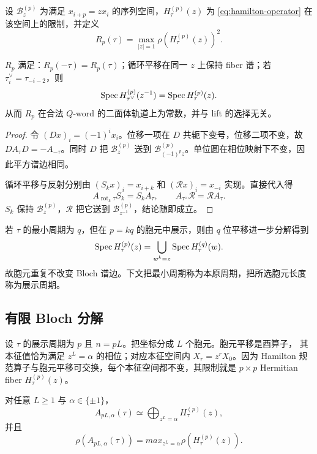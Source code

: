 设 $\mathcal B_z^{(p)}$ 为满足 $x_{i+p}=zx_i$ 的序列空间，$H_\tau^{(p)}(z)$ 为
\eqref{eq:hamilton-operator} 在该空间上的限制，并定义
\begin{equation}
 R_p(\tau)=\max_{|z|=1}\rho(H_\tau^{(p)}(z))^2.
 \label{eq:bloch-edge}
\end{equation}

\begin{proposition}
\label{prop:invariances}
$R_p$ 满足：$R_p(-\tau)=R_p(\tau)$；循环平移在同一 $z$ 上保持 fiber 谱；若
$\tau_i^\vee=\tau_{-i-2}$，则
\[
 \operatorname{Spec} H_{\tau^\vee}^{(p)}(z^{-1})=\operatorname{Spec} H_\tau^{(p)}(z).
\]
从而 $R_p$ 在合法 $Q$-word 的二面体轨道上为常数，并与 lift 的选择无关。
\end{proposition}

\begin{proof}
令 $(Dx)_i=(-1)^ix_i$。位移一项在 $D$ 共轭下变号，位移二项不变，故
$DA_\tau D=-A_{-\tau}$。同时 $D$ 把 $\mathcal B_z^{(p)}$ 送到
$\mathcal B_{(-1)^pz}^{(p)}$。单位圆在相位映射下不变，因此平方谱边相同。

循环平移与反射分别由 $(S_kx)_i=x_{i+k}$ 和 $(\mathcal Rx)_i=x_{-i}$ 实现。直接代入得
\[
 A_{\operatorname{rot}_k\tau}S_k=S_kA_\tau,
 \qquad A_{\tau^\vee}\mathcal R=\mathcal RA_\tau.
\]
$S_k$ 保持 $\mathcal B_z^{(p)}$，$\mathcal R$ 把它送到
$\mathcal B_{z^{-1}}^{(p)}$，结论随即成立。
\end{proof}

若 $\tau$ 的最小周期为 $q$，但在 $p=kq$ 的胞元中展示，则由 $q$ 位平移进一步分解得到
\begin{equation}
 \operatorname{Spec} H_\tau^{(p)}(z)=\bigcup_{w^k=z}\operatorname{Spec} H_\tau^{(q)}(w).
 \label{eq:zone-folding}
\end{equation}
故胞元重复不改变 Bloch 谱边。下文把最小周期称为本原周期，把所选胞元长度称为展示周期。

\subsection{有限 Bloch 分解}
\label{sec:finite-bloch}

设 $\tau$ 的展示周期为 $p$ 且 $n=pL$。把坐标分成 $L$ 个胞元。胞元平移是酉算子，
其本征值恰为满足 $z^L=\alpha$ 的相位；对应本征空间内 $X_r=z^rX_0$。因为 Hamilton
规范算子与胞元平移可交换，每个本征空间都不变，其限制就是 $p\times p$ Hermitian
fiber $H_\tau^{(p)}(z)$。

\begin{proposition}
\label{prop:finite-bloch}
对任意 $L\geq1$ 与 $\alpha\in\{\pm1\}$，
\begin{equation}
 A_{pL,\alpha}(\tau)\simeq\bigoplus_{z^L=\alpha}H_\tau^{(p)}(z),
 \label{eq:finite-bloch-sum}
\end{equation}
并且
\begin{equation}
 \rho(A_{pL,\alpha}(\tau))=max_{z^L=\alpha}\rho(H_\tau^{(p)}(z)).
 \label{eq:finite-radius-max}
\end{equation}
\end{proposition}


